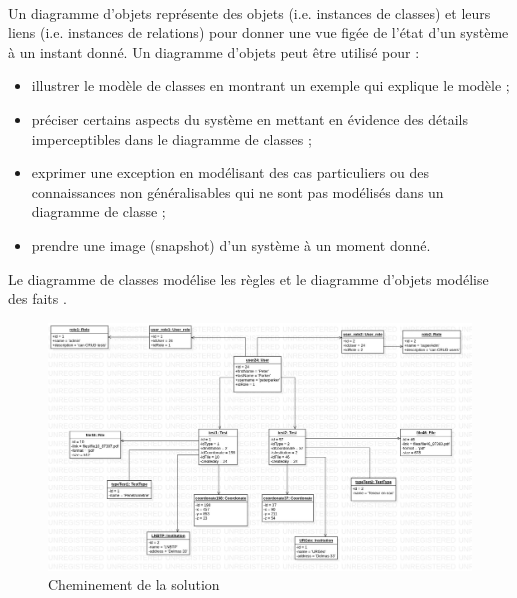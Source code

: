     \paragraph{}
    Un diagramme d'objets représente des objets (i.e. instances 
    de classes) et leurs liens (i.e. instances de relations) 
    pour donner une vue figée de l'état d'un système à un 
    instant donné. Un diagramme d'objets peut être utilisé pour :
    \begin{itemize}
        \item illustrer le modèle de classes en montrant un exemple qui explique le modèle ;
        \item  préciser certains aspects du système en mettant en évidence des détails imperceptibles dans le diagramme de classes ;
        \item exprimer une exception en modélisant des cas particuliers ou des connaissances non généralisables qui ne sont pas modélisés dans un diagramme de classe ;
        \item prendre une image (snapshot) d'un système à un moment donné.
    \end{itemize}
    Le diagramme de classes modélise les règles et le diagramme d'objets 
    modélise des faits \cite{audibert2009uml}.
    \begin{figure}[t]
        \centering
        \includegraphics[width=1\textwidth]{images/Analyse_des_besoins/ObjectDiagram.jpg}
        \caption{Cheminement de la solution}
        \label{fig:ObjectDiagram}
    \end{figure}

